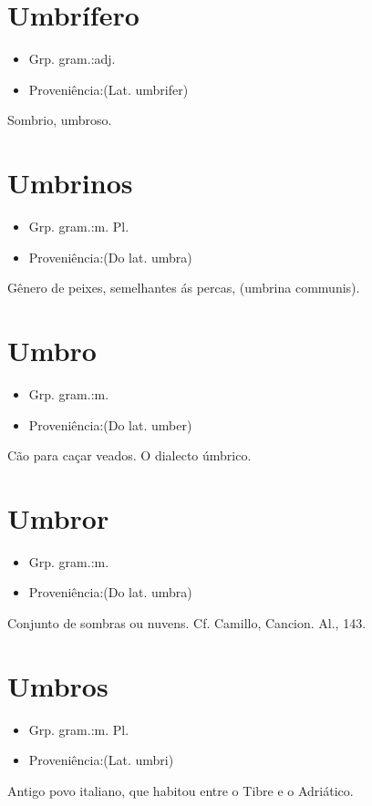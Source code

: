 \documentclass{article}
\begin{document}
\section{Umbrífero}
\begin{itemize}
\item {Grp. gram.:adj.}
\end{itemize}
\begin{itemize}
\item {Proveniência:(Lat. \textunderscore umbrifer\textunderscore )}
\end{itemize}
Sombrio, umbroso.
\section{Umbrinos}
\begin{itemize}
\item {Grp. gram.:m. Pl.}
\end{itemize}
\begin{itemize}
\item {Proveniência:(Do lat. \textunderscore umbra\textunderscore )}
\end{itemize}
Gênero de peixes, semelhantes ás percas, (\textunderscore umbrina communis\textunderscore ).
\section{Umbro}
\begin{itemize}
\item {Grp. gram.:m.}
\end{itemize}
\begin{itemize}
\item {Proveniência:(Do lat. \textunderscore umber\textunderscore )}
\end{itemize}
Cão para caçar veados.
O dialecto úmbrico.
\section{Umbror}
\begin{itemize}
\item {Grp. gram.:m.}
\end{itemize}
\begin{itemize}
\item {Proveniência:(Do lat. \textunderscore umbra\textunderscore )}
\end{itemize}
Conjunto de sombras ou nuvens. Cf. Camillo, \textunderscore Cancion. Al.\textunderscore , 143.
\section{Umbros}
\begin{itemize}
\item {Grp. gram.:m. Pl.}
\end{itemize}
\begin{itemize}
\item {Proveniência:(Lat. \textunderscore umbri\textunderscore )}
\end{itemize}
Antigo povo italiano, que habitou entre o Tibre e o Adriático.
\end{document}
